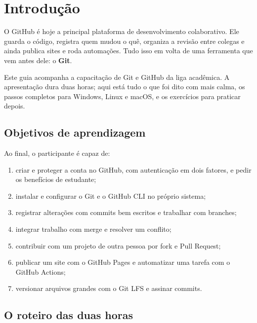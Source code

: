 \chapter{Introdução}
\label{cap:introducao}

O GitHub é hoje a principal plataforma de desenvolvimento colaborativo. Ele
guarda o código, registra quem mudou o quê, organiza a revisão entre colegas e
ainda publica sites e roda automações. Tudo isso em volta de uma ferramenta que
vem antes dele: o \textbf{Git}.

Este guia acompanha a capacitação de Git e GitHub da liga acadêmica. A
apresentação dura duas horas; aqui está tudo o que foi dito com mais calma, os
passos completos para Windows, Linux e macOS, e os exercícios para praticar
depois.

\section{Objetivos de aprendizagem}

Ao final, o participante é capaz de:

\begin{enumerate}
  \item criar e proteger a conta no GitHub, com autenticação em dois fatores, e
        pedir os benefícios de estudante;
  \item instalar e configurar o Git e o GitHub CLI no próprio sistema;
  \item registrar alterações com commits bem escritos e trabalhar com branches;
  \item integrar trabalho com merge e resolver um conflito;
  \item contribuir com um projeto de outra pessoa por fork e Pull Request;
  \item publicar um site com o GitHub Pages e automatizar uma tarefa com o
        GitHub Actions;
  \item versionar arquivos grandes com o Git LFS e assinar commits.
\end{enumerate}

\section{O roteiro das duas horas}

